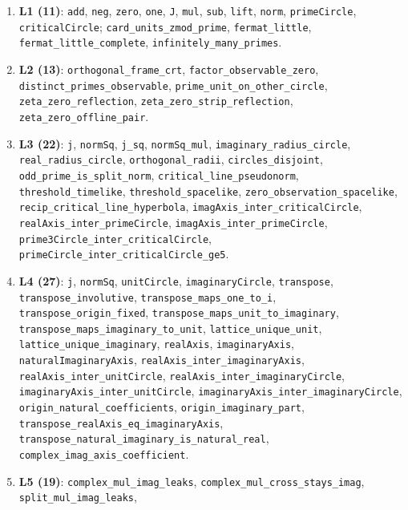 \documentclass{article}
\begin{document}
{\small\begin{sloppypar}
\begin{enumerate}
\item \textbf{L1 (11)}: \texttt{add}, \texttt{neg}, \texttt{zero},
\texttt{one}, \texttt{J}, \texttt{mul}, \texttt{sub}, \texttt{lift},
\texttt{norm}, \texttt{primeCircle}, \texttt{criticalCircle};
\texttt{card\_units\_zmod\_prime}, \texttt{fermat\_little},
\texttt{fermat\_little\_complete}, \texttt{infinitely\_many\_primes}.
\item \textbf{L2 (13)}: \texttt{orthogonal\_frame\_crt},
\texttt{factor\_observable\_zero}, \texttt{distinct\_primes\_observable},
\texttt{prime\_unit\_on\_other\_circle}, \texttt{zeta\_zero\_reflection},
\texttt{zeta\_zero\_strip\_reflection}, \texttt{zeta\_zero\_offline\_pair}.
\item \textbf{L3 (22)}: \texttt{j}, \texttt{normSq}, \texttt{j\_sq},
\texttt{normSq\_mul}, \texttt{imaginary\_radius\_circle},
\texttt{real\_radius\_circle}, \texttt{orthogonal\_radii},
\texttt{circles\_disjoint}, \texttt{odd\_prime\_is\_split\_norm},
\texttt{critical\_line\_pseudonorm}, \texttt{threshold\_timelike},
\texttt{threshold\_spacelike}, \texttt{zero\_observation\_spacelike},
\texttt{recip\_critical\_line\_hyperbola},
\texttt{imagAxis\_inter\_criticalCircle}, \texttt{realAxis\_inter\_primeCircle},
\texttt{imagAxis\_inter\_primeCircle},
\texttt{prime3Circle\_inter\_criticalCircle},
\texttt{primeCircle\_inter\_criticalCircle\_ge5}.
\item \textbf{L4 (27)}: \texttt{j}, \texttt{normSq}, \texttt{unitCircle},
\texttt{imaginaryCircle}, \texttt{transpose},
\texttt{transpose\_involutive}, \texttt{transpose\_maps\_one\_to\_i},
\texttt{transpose\_origin\_fixed}, \texttt{transpose\_maps\_unit\_to\_imaginary},
\texttt{transpose\_maps\_imaginary\_to\_unit},
\texttt{lattice\_unique\_unit}, \texttt{lattice\_unique\_imaginary},
\texttt{realAxis}, \texttt{imaginaryAxis}, \texttt{naturalImaginaryAxis},
\texttt{realAxis\_inter\_imaginaryAxis},
\texttt{realAxis\_inter\_unitCircle}, \texttt{realAxis\_inter\_imaginaryCircle},
\texttt{imaginaryAxis\_inter\_unitCircle},
\texttt{imaginaryAxis\_inter\_imaginaryCircle},
\texttt{origin\_natural\_coefficients}, \texttt{origin\_imaginary\_part},
\texttt{transpose\_realAxis\_eq\_imaginaryAxis},
\texttt{transpose\_natural\_imaginary\_is\_natural\_real},
\texttt{complex\_imag\_axis\_coefficient}.
\item \textbf{L5 (19)}: \texttt{complex\_mul\_imag\_leaks},
\texttt{complex\_mul\_cross\_stays\_imag}, \texttt{split\_mul\_imag\_leaks},

\end{enumerate}
\end{sloppypar}}
\end{document}
